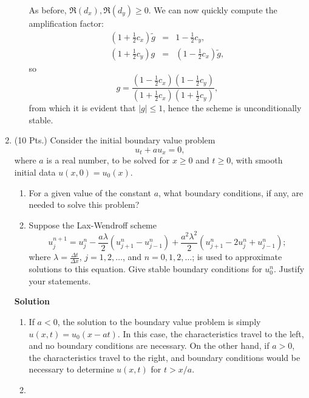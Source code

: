 \documentclass{article}
\begin{document}
\begin{enumerate}
\begin{enumerate}
As before, \(\Re(d_x), \Re(d_y) \geq 0\).  We can now quickly compute the amplification factor:
\begin{eqnarray*}
\left( 1 + \frac{1}{2} c_x \right) \widetilde{g} & = & 1 - \frac{1}{2} c_y, \\
\left( 1 + \frac{1}{2} c_y \right) g & = & \left( 1 - \frac{1}{2} c_x \right) \widetilde{g},
\end{eqnarray*}
so
\[g = \frac{\left( 1 - \frac{1}{2} c_x \right) \left( 1 - \frac{1}{2} c_y \right)}
           {\left( 1 + \frac{1}{2} c_x \right) \left( 1 + \frac{1}{2} c_y \right)},\]
from which it is evident that \(|g| \leq 1\), hence the scheme is unconditionally stable.

\end{enumerate}



\item (10 Pts.) Consider the initial boundary value problem
\[u_t + a u_x = 0,\]
where \(a\) is a real number, to be solved for \(x \geq 0\) and \(t \geq 0\), with smooth initial data \(u(x,0) = u_0(x)\).

\begin{enumerate}
\item For a given value of the constant \(a\), what boundary conditions, if any, are needed to solve this problem?

\item Suppose the Lax-Wendroff scheme
\[u^{n+1}_j = u^n_j - \frac{a\lambda}{2} \left( u^n_{j+1} - u^n_{j-1} \right) + \frac{a^2\lambda^2}{2} \left( u^n_{j+1} - 2u^n_j + u^n_{j-1} \right);\]
where \(\lambda = \frac{\Delta t}{\Delta x}\), \(j = 1, 2, \ldots\), and \(n = 0, 1, 2, \ldots\); is used to approximate solutions to this equation.  Give stable boundary conditions for \(u^n_0\).  Justify your statements.

\end{enumerate}

{\bf Solution}

\begin{enumerate}
\item If \(a < 0\), the solution to the boundary value problem is simply \(u(x,t) = u_0(x - at)\).  In this case, the characteristics travel to the left, and no boundary conditions are necessary.  On the other hand, if \(a > 0\), the characteristics travel to the right, and boundary conditions would be necessary to determine \(u(x,t)\) for \(t > x/a\).

\item 


\end{enumerate}
\end{enumerate}
\end{document}
